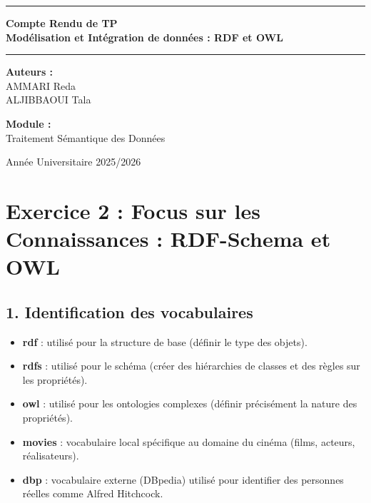 \documentclass[11pt,a4paper]{article}
\begin{document}
\begin{titlepage}
    \centering
    \vspace*{4cm}
    
    \rule{\textwidth}{1pt}\vspace{0.5cm}
    {\huge \bfseries \textcolor{primary}{Compte Rendu de TP}} \\ \vspace{0.3cm}
    {\Large \bfseries Modélisation et Intégration de données : RDF et OWL}
    \vspace{0.5cm}\rule{\textwidth}{1pt}
    
    \vspace{2cm}
    
    {\Large \textbf{Auteurs :}} \\ \vspace{0.2cm}
    {\large AMMARI Reda \\ ALJIBBAOUI Tala}
    
    \vspace{2cm}
    
    {\Large \textbf{Module :}} \\ \vspace{0.2cm}
    {\large Traitement Sémantique des Données}
    
    \vfill
    {\large Année Universitaire 2025/2026}
    
\end{titlepage}

\newpage

\section*{Exercice 2 : Focus sur les Connaissances : RDF-Schema et OWL}

\subsection*{1. Identification des vocabulaires}

\begin{itemize}
    \item \textbf{rdf} : utilisé pour la structure de base (définir le type des objets).
    \item \textbf{rdfs} : utilisé pour le schéma (créer des hiérarchies de classes et des règles sur les propriétés).
    \item \textbf{owl} : utilisé pour les ontologies complexes (définir précisément la nature des propriétés).
    \item \textbf{movies} : vocabulaire local spécifique au domaine du cinéma (films, acteurs, réalisateurs).
    \item \textbf{dbp} : vocabulaire externe (DBpedia) utilisé pour identifier des personnes réelles comme Alfred Hitchcock.
\end{itemize}
\end{document}
